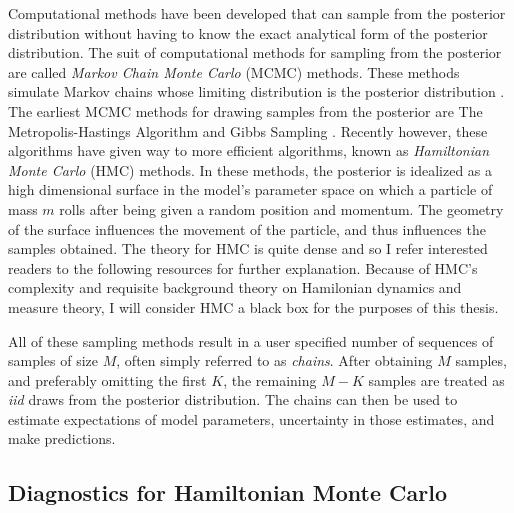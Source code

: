 Computational methods have been developed that can sample from the posterior distribution without having to know the exact analytical form of the posterior distribution. The suit of computational methods for sampling from the posterior are called \textit{Markov Chain Monte Carlo} (MCMC) methods.  These methods simulate Markov chains whose limiting distribution is the posterior distribution \cite{livingstone2016geometric}.  The earliest MCMC methods for drawing  samples from the posterior are The Metropolis-Hastings Algorithm and Gibbs Sampling \cite{gelman2013bayesian,mcelreath2016statistical}.  Recently however, these algorithms have given way to more efficient algorithms, known as \textit{Hamiltonian Monte Carlo} (HMC) methods.  In these methods, the posterior is idealized as a high dimensional surface in the model's parameter space on which a particle of mass $ m $ rolls after being given a random position and momentum.  The geometry of the surface influences the movement of the particle, and thus influences the samples obtained.   The theory for HMC is quite dense and so  I refer interested readers to the following resources \cite{ gelman2013bayesian, livingstone2016geometric, mcelreath2016statistical,neal2011mcmc, hoffman2014no,betancourt2017conceptual} for further explanation.  Because of HMC's complexity and requisite background theory on Hamilonian dynamics and measure theory, I will consider HMC a black box for the purposes of this thesis.

All of these sampling methods result in a user specified number of sequences of samples of size $ M$, often simply referred to as \textit{chains}. After obtaining $ M $ samples, and preferably omitting the first $ K $, the remaining $ M-K $ samples are treated as \textit{iid} draws from the posterior distribution.  The chains can then be used to estimate expectations of model parameters, uncertainty in those estimates, and make predictions.

\subsection{Diagnostics for Hamiltonian Monte Carlo}


